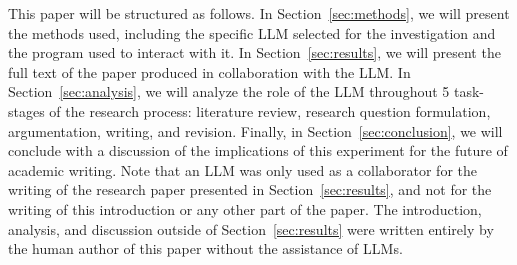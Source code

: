 This paper will be structured as follows. In Section~\ref{sec:methods}, we will
present the methods used, including the specific LLM selected for the
investigation and the program used to interact with it. In
Section~\ref{sec:results}, we will present the full text of the paper produced
in collaboration with the LLM. In Section~\ref{sec:analysis}, we will analyze
the role of the LLM throughout 5 task-stages of the research process: literature
review, research question formulation, argumentation, writing, and revision.
Finally, in Section~\ref{sec:conclusion}, we will conclude with a discussion of
the implications of this experiment for the future of academic writing. Note
that an LLM was only used as a collaborator for the writing of the research
paper presented in Section~\ref{sec:results}, and not for the writing of this
introduction or any other part of the paper. The introduction, analysis, and
discussion outside of Section~\ref{sec:results} were written entirely by the
human author of this paper without the assistance of LLMs.
